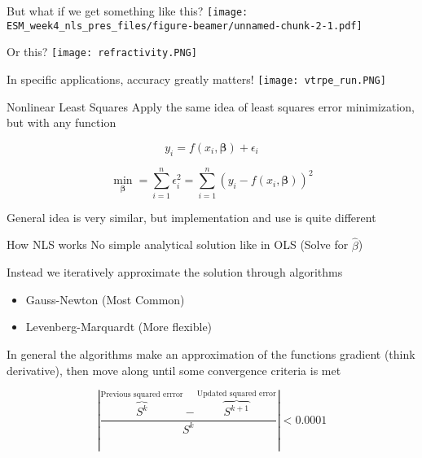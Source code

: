 \documentclass[
  ignorenonframetext,
]{beamer}
\begin{document}
\begin{frame}{But what if we get something like this?}
\protect\hypertarget{but-what-if-we-get-something-like-this}{}
\texttt{[image: ESM\_week4\_nls\_pres\_files/figure-beamer/unnamed-chunk-2-1.pdf]}
\end{frame}

\begin{frame}{Or this?}
\protect\hypertarget{or-this}{}
\texttt{[image: refractivity.PNG]}
\end{frame}

\begin{frame}{In specific applications, accuracy greatly matters!}
\protect\hypertarget{in-specific-applications-accuracy-greatly-matters}{}
\texttt{[image: vtrpe\_run.PNG]}
\end{frame}

\begin{frame}{Nonlinear Least Squares}
\protect\hypertarget{nonlinear-least-squares}{}
Apply the same idea of least squares error minimization, but with any
function

\begin{equation}
y_i=f(x_i,\boldsymbol\beta)+\epsilon_i 
\end{equation}

\begin{equation}
\min_{\boldsymbol\beta}=\sum^n_{i=1}\epsilon_i^2=\sum^n_{i=1}(y_i-f(x_i,\boldsymbol\beta))^2
\end{equation}

General idea is very similar, but implementation and use is quite
different
\end{frame}

\begin{frame}{How NLS works}
\protect\hypertarget{how-nls-works}{}
No simple analytical solution like in OLS (Solve for \(\hat\beta\))

Instead we iteratively approximate the solution through algorithms

\begin{itemize}
\item
  Gauss-Newton (Most Common)
\item
  Levenberg-Marquardt (More flexible)
\end{itemize}

In general the algorithms make an approximation of the functions
gradient (think derivative), then move along until some convergence
criteria is met

\[
|\frac{\overbrace{S^k}^{\text{Previous squared errror}}-\overbrace{S^{k+1}}^{\text{Updated squared error}}}{S^k}|<0.0001
\]
\end{frame}
\end{document}
